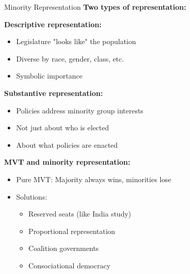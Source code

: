 \documentclass[10pt]{beamer}
\begin{document}
\begin{frame}[allowframebreaks]{Minority Representation}
\textbf{Two types of representation:}



\textbf{Descriptive representation:}
\begin{itemize}
\item Legislature "looks like" the population
\item Diverse by race, gender, class, etc.
\item Symbolic importance
\end{itemize}



\textbf{Substantive representation:}
\begin{itemize}
\item Policies address minority group interests
\item Not just about who is elected
\item About what policies are enacted
\end{itemize}

  \framebreak  

\textbf{MVT and minority representation:}
\begin{itemize}
\item Pure MVT: Majority always wins, minorities lose
\item Solutions:
\begin{itemize}
\item Reserved seats (like India study)
\item Proportional representation
\item Coalition governments
\item Consociational democracy
\end{itemize}
\end{itemize}
\end{frame}
\end{document}

